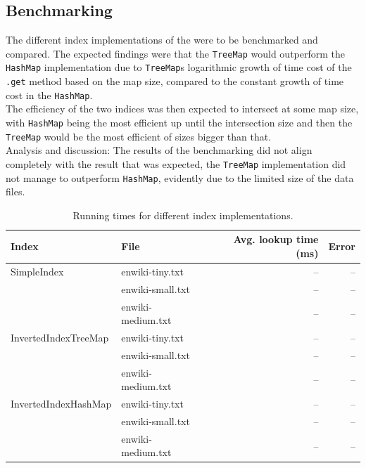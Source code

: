 \subsection{Benchmarking}
The different index implementations of the were to be benchmarked and compared. The expected 	findings were that the \verb+TreeMap+ would outperform the \verb+HashMap+ implementation due to \verb+TreeMap+s logarithmic growth of time cost of the \verb+.get+ method based on the map size, compared to the constant growth of time cost in the \verb+HashMap+. \\
The efficiency of the two indices was then expected to intersect at some map size, with \verb+HashMap+ being the most efficient up until the intersection size and then the \verb+TreeMap+ would be the most efficient of sizes bigger than that. \\



Analysis and discussion:
The results of the benchmarking did not align completely with the result that was expected, the \verb+TreeMap+ implementation did not manage to outperform \verb+HashMap+, evidently due to the limited size of the data files. 

\begin{table}[t]
\begin{tabular}{@{}llr@{}r} \toprule
	Index & File & Avg. lookup time (ms) &Error \\ \midrule
	SimpleIndex  & enwiki-tiny.txt	& -- & -- \\ 
				 & enwiki-small.txt	& -- & -- \\
				 & enwiki-medium.txt& -- & -- \\
	InvertedIndexTreeMap	& enwiki-tiny.txt	& -- & --\\
							& enwiki-small.txt	& -- & --\\
							& enwiki-medium.txt & -- & --\\
	InvertedIndexHashMap	& enwiki-tiny.txt	& -- & --\\
							& enwiki-small.txt	& -- & --\\
							& enwiki-medium.txt & -- & --\\ \bottomrule
\end{tabular}
	\caption{Running times for different index implementations.}
\label{tab:benchmark:indices}
\end{table}


